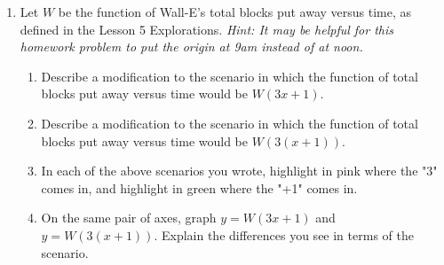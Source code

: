 \documentclass[11pt]{article}
\theoremstyle{definition}
\begin{document}
\begin{enumerate}
\item Let $W$ be the function of Wall-E's total blocks put away versus time, as defined in the Lesson 5 Explorations. {\it Hint: It may be helpful for this homework problem to put the origin at 9am instead of at noon.}
	\begin{enumerate}
	\item Describe a modification to the scenario in which the function of total blocks put away versus time would be $W(3x+1)$. 
	\item  Describe a modification to the scenario in which the function of total blocks put away versus time would be $W(3(x+1))$. 
	\item In each of the above scenarios you wrote, highlight in pink where the "3" comes in, and highlight in green where the "+1" comes in. 
	\item On the same pair of axes, graph $y=W(3x+1)$ and $y=W(3(x+1))$. Explain the differences you see in terms of the scenario.
	\end{enumerate} 
\end{enumerate}
\end{document}
